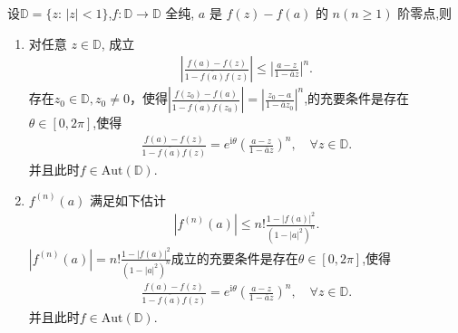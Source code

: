 \documentclass[../../main.tex]{subfiles}%
\begin{document}
\begin{theorem}\label{theorem:Schwarz-Pick定理的一般形式}
设$\mathbb{D}=\{z:\,|z|<1\}$,$f: \mathbb{D} \to \mathbb{D}$ 全纯, $a$ 是 $f(z)-f(a)$ 的 $n(n\geqslant 1)$ 阶零点,则
\begin{enumerate}[(1)]
\item 对任意 $z\in\mathbb{D}$, 成立
\begin{align*}
\left|\frac{f(a)-f(z)}{1-\overline{f(a)}f(z)}\right|\leqslant\left|\frac{a-z}{1-\overline{a}z}\right|^n.
\end{align*}
存在$z_0\in\mathbb{D},z_0\neq 0$，使得$\left|\frac{f(z_0)-f(a)}{1-\overline{f(a)}f(z_0)}\right|=\left|\frac{z_0-a}{1-\overline{a}z_0}\right|^n$,的充要条件是存在$\theta\in[0,2\pi]$,使得
\begin{align*}
\frac{f(a)-f(z)}{1-\overline{f(a)}f(z)}=e^{\mathrm{i}\theta}\left(\frac{a-z}{1-\overline{a}z}\right)^n,\quad \forall z\in\mathbb{D}.
\end{align*}
并且此时$f\in\mathrm{Aut}(\mathbb{D})$.

\item $f^{(n)}(a)$ 满足如下估计
\begin{align*}
|f^{(n)}(a)|\leqslant n!\frac{1-|f(a)|^2}{(1-|a|^2)^n}.
\end{align*}
$|f^{(n)}(a)|=n!\frac{1-|f(a)|^2}{(1-|a|^2)^n}$成立的充要条件是存在$\theta\in[0,2\pi]$,使得
\begin{align*}
\frac{f(a)-f(z)}{1-\overline{f(a)}f(z)}=e^{\mathrm{i}\theta}\left(\frac{a-z}{1-\overline{a}z}\right)^n,\quad \forall z\in\mathbb{D}.
\end{align*}
并且此时$f\in\mathrm{Aut}(\mathbb{D})$.
\end{enumerate}
\end{theorem}
\end{document}
